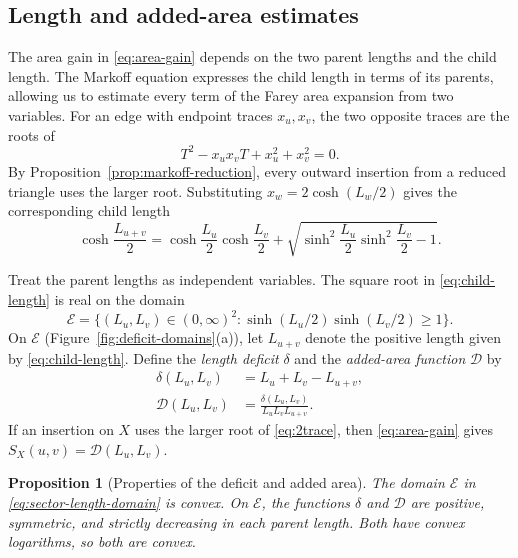 \documentclass[10pt,twoside]{article}
\theoremstyle{plain}
\newtheorem{proposition}[theorem]{Proposition}
\theoremstyle{definition}
\theoremstyle{remark}
\begin{document}
\subsection{Length and added-area estimates}
\label{sec:local}
The area gain in \eqref{eq:area-gain} depends on the two parent
lengths and the child length. The Markoff equation expresses the
child length in terms of its parents, allowing us to estimate every
term of the Farey area expansion from two variables.
For an edge with endpoint traces $x_u,x_v$, the two opposite traces
are the roots of
\begin{equation}
\label{eq:2trace}
T^2-x_ux_vT+x_u^2+x_v^2=0.
\end{equation}
By Proposition~\ref{prop:markoff-reduction}, every outward insertion
from a reduced triangle uses the larger root. Substituting
$x_w=2\cosh(L_w/2)$ gives the corresponding child length
\begin{equation}
\label{eq:child-length}
\cosh\frac{L_{u+v}}{2}
=
\cosh\frac{L_u}{2}\cosh\frac{L_v}{2}
+
\sqrt{\sinh^2\frac{L_u}{2}\sinh^2\frac{L_v}{2}-1}.
\end{equation}

Treat the parent lengths as independent variables. The square root
in \eqref{eq:child-length} is real on the domain
\begin{equation}
\label{eq:sector-length-domain}
\mathcal E=\{(L_u,L_v)\in(0,\infty)^2:
\sinh(L_u/2)\sinh(L_v/2)\geq1\}.
\end{equation}
On $\mathcal E$ (Figure~\ref{fig:deficit-domains}(a)), let $L_{u+v}$
denote the positive length given by \eqref{eq:child-length}.
Define the \emph{length deficit} $\delta$
and the \emph{added-area function} $\mathcal D$ by
\begin{equation}
\label{eq:length-deficit}
\begin{aligned}
\delta(L_u,L_v)&=L_u+L_v-L_{u+v},\\
\mathcal D(L_u,L_v)&=\frac{\delta(L_u,L_v)}{L_uL_vL_{u+v}}.
\end{aligned}
\end{equation}
If an insertion on $X$ uses the larger root of \eqref{eq:2trace},
then \eqref{eq:area-gain} gives $S_X(u,v)=\mathcal D(L_u,L_v)$.

\begin{proposition}[Properties of the deficit and added area]
\label{prop:defect-convexity}
The domain $\mathcal E$ in \eqref{eq:sector-length-domain} is convex.
On $\mathcal E$, the functions $\delta$ and $\mathcal D$ are positive,
symmetric, and strictly decreasing in each parent length. Both have
convex logarithms, so both are convex.
\end{proposition}
\end{document}
